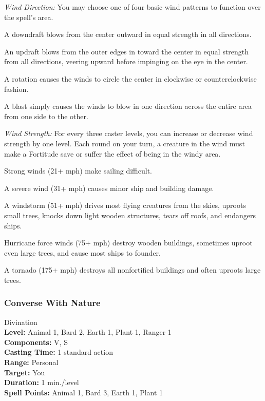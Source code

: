 \begin{list}{}{\leftmargin=1em}
 \item \emph{Wind Direction:}
You may choose one of four basic wind patterns to function over the spell's area.
\begin{list}{}{\leftmargin=1em}
 \item A downdraft blows from the center outward in equal strength in all directions.
 \item An updraft blows from the outer edges in toward the center in equal strength from all directions, veering upward before impinging on the eye in the center.
 \item A rotation causes the winds to circle the center in clockwise or counterclockwise fashion.
 \item A blast simply causes the winds to blow in one direction across the entire area from one side to the other.
\end{list}
\item \emph{Wind Strength:}
For every three caster levels, you can increase or decrease wind strength by one level. Each round on your turn, a creature in the wind must make a Fortitude save or suffer the effect of being in the windy area.
\begin{list}{}{\leftmargin=1em}
 \item Strong winds (21+ mph) make sailing difficult.
 \item A severe wind (31+ mph) causes minor ship and building damage.
 \item A windstorm (51+ mph) drives most flying creatures from the skies, uproots small trees, knocks down light wooden structures, tears off roofs, and endangers ships.
 \item Hurricane force winds (75+ mph) destroy wooden buildings, sometimes uproot even large trees, and cause most ships to founder.
 \item A tornado (175+ mph) destroys all nonfortified buildings and often uproots large trees.
\end{list}
\end{list}
\subsubsection{Converse With Nature}
\label{Spell:ConverseWithNature}
Divination
\\ \textbf{Level:} Animal 1, Bard 2, Earth 1, Plant 1, Ranger 1
\\ \textbf{Components:} V, S
\\ \textbf{Casting Time:} 1 standard action
\\ \textbf{Range:} Personal
\\ \textbf{Target:} You
\\ \textbf{Duration:} 1 min./level
\\ \textbf{Spell Points:} Animal 1, Bard 3, Earth 1, Plant 1

